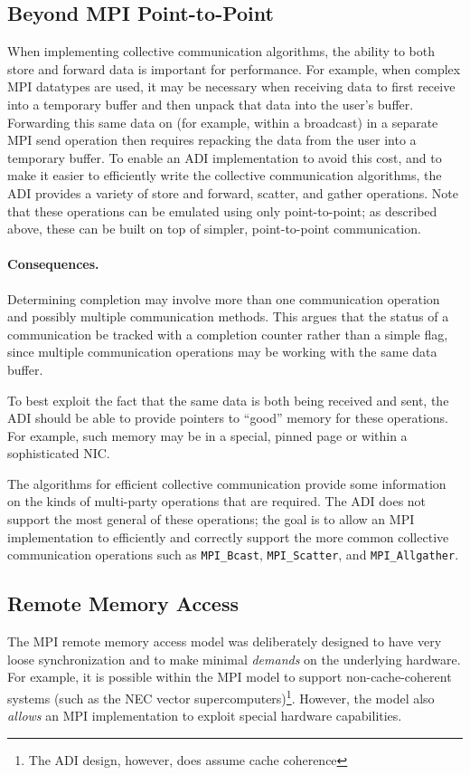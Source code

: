 \documentclass{article}
\def\code#1{\texttt{#1}}
\begin{document}
\subsection{Beyond MPI Point-to-Point}
When implementing collective communication algorithms, the ability to
both store and forward data is important for performance.  For
example, when complex MPI datatypes are used, it may be necessary when
receiving data to first receive into a temporary buffer and then
unpack that data into the user's buffer.  Forwarding this same data on
(for example, within a broadcast) in a separate MPI send operation
then requires repacking the data from the user into a temporary
buffer.  To enable an ADI implementation to avoid this cost, and to
make it easier to efficiently write the collective communication
algorithms, the ADI provides a variety of store and forward, scatter,
and gather operations.  Note that these operations can be emulated
using only point-to-point; as described above, these can be built on
top of simpler, point-to-point communication.  


\paragraph{Consequences.}
Determining completion may involve more than one communication
operation and possibly multiple communication methods.  This argues
that the status of a communication be tracked with a completion
counter rather than a simple flag, since multiple communication
operations may be working with the same data buffer.  

To best exploit the fact that the same data is both being received and
sent, the ADI should be able to provide pointers to ``good'' memory
for these operations.  For example, such memory may be in a special,
pinned page or within a sophisticated NIC.  

The algorithms for efficient collective communication provide some
information on the kinds of multi-party operations that are required.
The ADI does not support the most general of these operations; the
goal is to allow an MPI implementation to efficiently and correctly
support the more common collective communication operations such as
\code{MPI_Bcast}, \code{MPI_Scatter}, and \code{MPI_Allgather}.

\subsection{Remote Memory Access}
\label{sec:rma-design}
The MPI remote memory access model was deliberately designed to have
very loose synchronization and to make minimal \emph{demands} on the
underlying hardware.  For example, it is possible within the MPI model
to support non-cache-coherent systems (such as the NEC vector
supercomputers)\footnote{The ADI design, however, does assume cache
coherence}.  However, the model also \emph{allows} an MPI 
implementation to exploit special hardware capabilities.  
\end{document}
